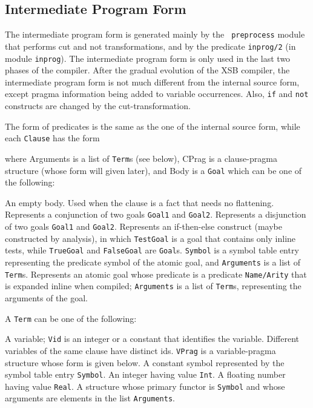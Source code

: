 \subsection{Intermediate Program Form}

The intermediate program form is generated mainly by the {\tt
preprocess} module that performs cut and not transformations, and by
the predicate {\tt inprog/2} (in module {\tt inprog}).  The intermediate
program form is only used in the last two phases of the compiler.
After the gradual evolution of the XSB compiler, the intermediate program
form is not much different from the internal source form, except
pragma information being added to variable occurrences.  Also, {\tt if}
and {\tt not} constructs are changed by the cut-transformation.

The form of predicates is the same as the one of the internal source
form, while each {\tt Clause} has the form


where {\sf Arguments} is a list of {\tt Term}s (see below), {\sf CPrag}
is a clause-pragma structure (whose form will given later), and
{\sf Body} is a {\tt Goal} which can be one of the following:

\begin{description}
	An empty body.  Used when the clause is a fact that needs no
	flattening.
	Represents a conjunction of two goals {\tt Goal1} and {\tt Goal2}.
	Represents a disjunction of two goals {\tt Goal1} and {\tt Goal2}.
	Represents an if-then-else construct (maybe constructed by analysis),
	in which {\tt TestGoal} is a goal that contains only inline tests,
	while {\tt TrueGoal} and {\tt FalseGoal} are {\tt Goal}s.
	{\tt Symbol} is a symbol table entry representing the predicate
	symbol of the atomic goal, and {\tt Arguments} is a list of
	{\tt Term}s.
	Represents an atomic goal whose predicate is a predicate
	{\tt Name/Arity} that is expanded inline when compiled;
	{\tt Arguments} is a list of {\tt Term}s, representing the
	arguments of the goal.
\end{description}

A {\tt Term} can be one of the following:

\begin{description}
	A variable; {\tt Vid} is an integer or a constant that identifies
	the variable. Different variables of the same clause have distinct ids.
	{\tt VPrag} is a variable-pragma structure whose form is given below.
	A constant symbol represented by the symbol table entry {\tt Symbol}.
	An integer having value {\tt Int}.
	A floating number having value {\tt Real}.
	A structure whose primary functor is {\tt Symbol} and whose
	arguments are elements in the list {\tt Arguments}.
\end{description}


